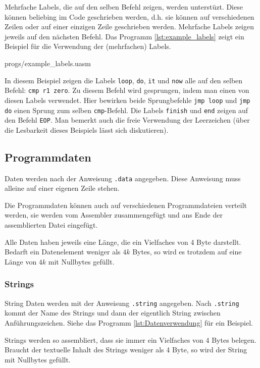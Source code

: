 Mehrfache Labels, die auf den selben Befehl zeigen, werden unterstüzt. Diese
können beliebing im Code geschrieben werden, d.h. sie können auf verschiedenen
Zeilen oder auf einer einzigen Zeile geschrieben werden. Mehrfache Labels
zeigen jeweils auf den nächsten Befehl. Das Programm \ref{lst:example_labels}
zeigt ein Beispiel für die Verwendung der (mehrfachen) Labels.


{progs/example_labels.uasm}

In diesem Beispiel zeigen die Labels \texttt{loop}, \texttt{do}, \texttt{it} und
\texttt{now} alle auf den selben Befehl: \texttt{cmp r1 zero}. Zu diesem Befehl
wird gesprungen, indem man einen von diesen Labels verwendet. Hier bewirken
beide Sprungbefehle \texttt{jmp loop} und \texttt{jmp do} einen Sprung zum
selben \texttt{cmp}-Befehl. Die Labels \texttt{finish} und \texttt{end} zeigen
auf den Befehl \texttt{EOP}. Man bemerkt auch die freie Verwendung der
Leerzeichen (über die Lesbarkeit dieses Beispiels lässt sich diskutieren).


\subsection{Programmdaten}

Daten werden nach der Anweisung \texttt{.data} angegeben. Diese Anweisung muss
alleine auf einer eigenen Zeile stehen.

Die Programmdaten können auch auf
verschiedenen Programmdateien verteilt werden, sie werden vom Assembler
zusammengefügt und ans Ende der assemblierten Datei eingefügt.

Alle Daten haben jeweils eine Länge, die ein Vielfaches von 4 Byte darstellt.
Bedarft ein Datenelement weniger als $4k$ Bytes, so wird es trotzdem auf
eine Länge von $4 k$ mit Nullbytes gefüllt.

\subsubsection{Strings}

String Daten werden mit der Anweisung \texttt{.string} angegeben.
Nach \texttt{.string} kommt der Name des Strings und dann der eigentlich String
zwischen Anführungszeichen. Siehe das Programm \ref{lst:Datenverwendung} für
ein Beispiel.

Strings werden so assembliert, dass sie immer ein Vielfaches von 4 Bytes
belegen. Braucht der textuelle Inhalt des Strings weniger als 4 Byte, so wird
der String mit Nullbytes gefüllt.


